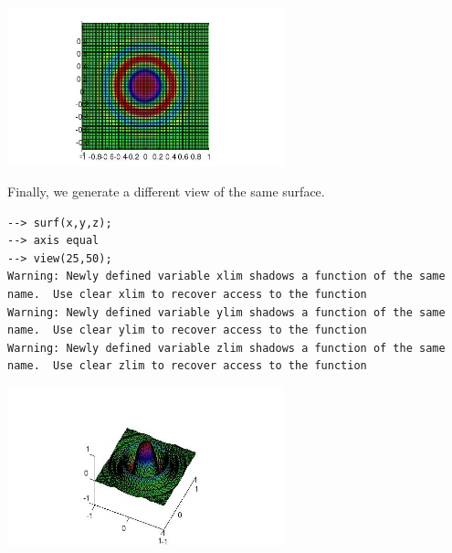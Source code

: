 \centerline{\includegraphics[width=8cm]{view2}}

Finally, we generate a different view of the same surface.
\begin{verbatim}
--> surf(x,y,z);
--> axis equal
--> view(25,50);
Warning: Newly defined variable xlim shadows a function of the same name.  Use clear xlim to recover access to the function
Warning: Newly defined variable ylim shadows a function of the same name.  Use clear ylim to recover access to the function
Warning: Newly defined variable zlim shadows a function of the same name.  Use clear zlim to recover access to the function
\end{verbatim}


\centerline{\includegraphics[width=8cm]{view3}}

